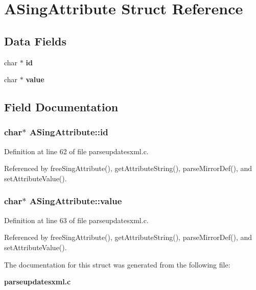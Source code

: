 \section{ASing\-Attribute Struct Reference}
\label{structASingAttribute}
\subsection*{Data Fields}
\begin{CompactItemize}
\item 
char $\ast$ {\bf id}
\item 
char $\ast$ {\bf value}
\end{CompactItemize}


\subsection{Field Documentation}
\subsubsection{\setlength{\rightskip}{0pt plus 5cm}char$\ast$ {\bf ASing\-Attribute::id}}\label{structASingAttribute_o0}




Definition at line 62 of file parseupdatesxml.c.

Referenced by free\-Sing\-Attribute(), get\-Attribute\-String(), parse\-Mirror\-Def(), and set\-Attribute\-Value().
\subsubsection{\setlength{\rightskip}{0pt plus 5cm}char$\ast$ {\bf ASing\-Attribute::value}}\label{structASingAttribute_o1}




Definition at line 63 of file parseupdatesxml.c.

Referenced by free\-Sing\-Attribute(), get\-Attribute\-String(), parse\-Mirror\-Def(), and set\-Attribute\-Value().

The documentation for this struct was generated from the following file:\begin{CompactItemize}
\item 
{\bf parseupdatesxml.c}\end{CompactItemize}
